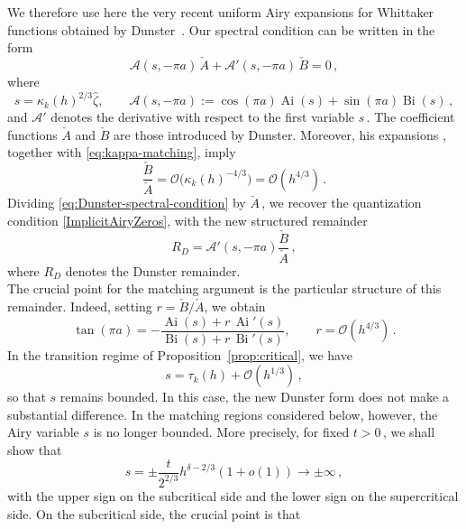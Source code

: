 \documentclass[11pt]{amsart}
\numberwithin{equation}{section}
\theoremstyle{remark}
\newcommand{\mn}{\medskip\noindent}
\newcommand{\Ai}{\operatorname{Ai}}
\newcommand{\Bi}{\operatorname{Bi}}
\begin{document}
\mn
We therefore use here the very recent uniform Airy expansions for
Whittaker functions obtained by Dunster~\cite[Theorem~3.1, Eqs.~(3.40)--(3.41)]
{Dunster2026}.  Our spectral condition can be written in the form
\begin{equation}\label{eq:Dunster-spectral-condition}
	\mathcal A(s,-\pi a)\,\check A
	+
	\mathcal A'(s,-\pi a)\,\check B
	=0\,,
\end{equation}
where
\[
s=\kappa_k(h)^{2/3}\widehat\zeta,
\qquad
\mathcal A(s,-\pi a)
:=
\cos(\pi a)\Ai(s)
+
\sin(\pi a)\Bi(s)\,,
\]
and $\mathcal A'$ denotes the derivative with respect to the first
variable $s\,$. The coefficient functions $\check A$ and $\check B$
are those introduced by Dunster. Moreover, his expansions
\cite[Eqs.~(3.37)--(3.38)]{Dunster2026}, together with
\eqref{eq:kappa-matching}, imply
\begin{equation}\label{eq:Dunster-ratio}
	\frac{\check B}{\check A}
	=
	\mathcal O\bigl(\kappa_k(h)^{-4/3}\bigr)
	=
	\mathcal O(h^{4/3})\,.
\end{equation}
Dividing \eqref{eq:Dunster-spectral-condition} by $\check A\,$, we recover
the quantization condition \eqref{ImplicitAiryZeros}, with the new
structured remainder
\begin{equation}\label{eq:Dunster-remainder}
	R_D
	=
	\mathcal A'(s,-\pi a)\frac{\check B}{\check A}\,,
\end{equation}
where $R_D$ denotes the Dunster remainder.\\
The crucial point for the matching argument is the particular structure
of this remainder. Indeed, setting $r=\check B/\check A$, we obtain
\begin{equation}\label{eq:Dunster-tangent}
	\tan(\pi a)
	=
	-\frac{\Ai(s)+r\,\Ai'(s)}
	{\Bi(s)+r\,\Bi'(s)},
	\qquad
	r
	=\mathcal O(h^{4/3})\,.
\end{equation}
In the transition regime of Proposition~\ref{prop:critical}, we have
\[
s=\tau_k(h)+\mathcal O(h^{1/3})\,,
\]
so that $s$ remains bounded. In this case, the new Dunster form does not
make a substantial difference. In the matching regions considered below, however, the Airy variable $s$
is no longer bounded. More precisely, for fixed $t>0\,$, we shall show that
\begin{equation}\label{eq:Airy-variable-matching}
	s
	=
	\pm\frac{t}{2^{2/3}}h^{\delta-2/3}(1+o(1))
	\longrightarrow\pm\infty\,,
\end{equation}
with the upper sign on the subcritical side and the lower sign on the
supercritical side. On the subcritical side, the crucial point is that
\end{document}
